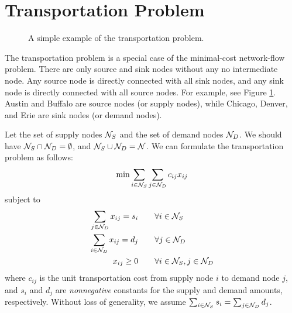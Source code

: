 \section{Transportation Problem}


\begin{figure}
\caption{A simple example of the transportation problem.\label{fig:transportation}}
\end{figure}



The transportation problem is a special case of the minimal-cost network-flow problem. There are only source and sink nodes without any no intermediate node. Any source node is directly connected with all sink nodes, and any sink node is directly connected with all source nodes. For example, see Figure \ref{fig:transportation}. Austin and Buffalo are source nodes (or supply nodes), while Chicago, Denver, and Erie are sink nodes (or demand nodes).

Let the set of supply nodes $\mathcal{N}_S$ and the set of demand nodes $\mathcal{N}_D$. We should have $\mathcal{N}_S \cap \mathcal{N}_D = \emptyset$, and $\mathcal{N}_S \cup \mathcal{N}_D = \mathcal{N}$. We can formulate the transportation problem as follows:
\begin{equation*}
	\min \sum_{i\in\mathcal{N}_S} \sum_{j\in\mathcal{N}_D} c_{ij} x_{ij}
\end{equation*}
subject to
\begin{align*}
	\sum_{j\in\mathcal{N}_D} x_{ij} = s_i & \qquad \forall i\in\mathcal{N}_S \\
	\sum_{i\in\mathcal{N}_D} x_{ij} = d_j & \qquad \forall j\in\mathcal{N}_D \\
	x_{ij} \geq 0 & \qquad \forall i\in\mathcal{N}_S, j\in\mathcal{N}_D
\end{align*}
where $c_{ij}$ is the unit transportation cost from supply node $i$ to demand node $j$, and $s_i$ and $d_j$ are \emph{nonnegative} constants for the supply and demand amounts, respectively. Without loss of generality, we assume $\sum_{i\in\mathcal{N}_S}s_i = \sum_{j\in\mathcal{N}_D}d_j$.


